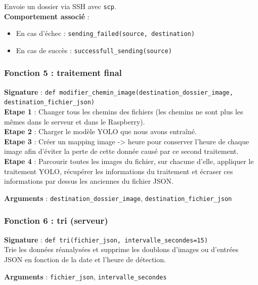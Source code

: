 \documentclass[a4paper,11pt]{article}
\begin{document}
	Envoie un dossier via SSH avec \texttt{scp}. \\
	\textbf{Comportement associé} :
	\begin{itemize}
		\item En cas d’échec : \texttt{sending\_failed(source, destination)}
		\item En cas de succès : \texttt{successfull\_sending(source)}
	\end{itemize}
	
	\subsubsection*{Fonction 5 : traitement final}
	\textbf{Signature} : \texttt{def modifier\_chemin\_image(destination\_dossier\_image,\\ destination\_fichier\_json)} \\
	
	\textbf{Etape 1} : Changer tous les chemins des fichiers (les chemins ne sont plus les mêmes dans le serveur et dans le Raspberry).\\
	\textbf{Etape 2} : Charger le modèle YOLO que nous avons entraîné.\\
	\textbf{Etape 3} : Créer un mapping image -> heure pour conserver l'heure de chaque image afin d'éviter la perte de cette donnée causé par ce second traitement.\\
	\textbf{Etape 4} : Parcourir toutes les images du fichier, sur chacune d'elle, appliquer le traitement YOLO, récupérer les informations du traitement et écraser ces informations par dessus les anciennes du fichier JSON.
	
	
	\textbf{Arguments} : \texttt{destination\_dossier\_image}, \texttt{destination\_fichier\_json}
	\subsubsection*{Fonction 6 : tri (serveur)}
	\textbf{Signature} : \texttt{def tri(fichier\_json, intervalle\_secondes=15)} \\
	
	Trie les données réanalysées et supprime les doublons d’images ou d’entrées JSON en fonction de la date et l'heure de détection.
	
	\textbf{Arguments} : \texttt{fichier\_json}, \texttt{intervalle\_secondes}
	
\end{document}
